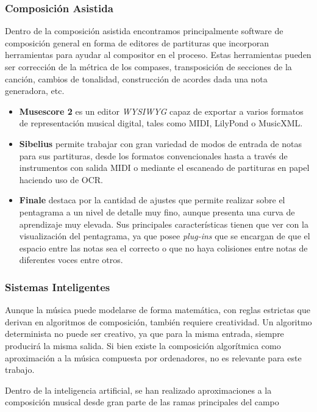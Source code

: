 \subsubsection{Composición Asistida}
Dentro de la composición asistida encontramos principalmente software de composición general en forma de editores de partituras que incorporan herramientas para ayudar al compositor en el proceso. Estas herramientas pueden ser corrección de la métrica de los compases, transposición de secciones de la canción, cambios de tonalidad, construcción de acordes dada una nota generadora, etc.

\begin{itemize}
 \item \textbf{Musescore 2} es un editor \textit{WYSIWYG} capaz de exportar a varios formatos de representación musical digital, tales como MIDI, LilyPond o MusicXML.
\item \textbf{Sibelius} permite trabajar con gran variedad de modos de entrada de notas para sus partituras, desde los formatos convencionales hasta a través de instrumentos con salida MIDI o mediante el escaneado de partituras en papel haciendo uso de OCR.
\item \textbf{Finale} destaca por la cantidad de ajustes que permite realizar sobre el pentagrama a un nivel de detalle muy fino, aunque presenta una curva de aprendizaje muy elevada. Sus principales características  tienen que ver con la visualización del pentagrama, ya que posee \textit{plug-ins} que se encargan de que el espacio entre las notas sea el correcto o que no haya colisiones entre notas de diferentes voces entre otros. 
\end{itemize}


\subsubsection{Sistemas Inteligentes}
Aunque la música puede modelarse de forma matemática, con reglas estrictas que derivan en algoritmos de composición, también requiere creatividad. Un algoritmo determinista no puede ser creativo, ya que para la misma entrada, siempre producirá la misma salida. Si bien existe la composición algorítmica como aproximación a la música compuesta por ordenadores, no es relevante para este trabajo.

Dentro de la inteligencia artificial, se han realizado aproximaciones a la composición musical desde gran parte de las ramas principales del campo

